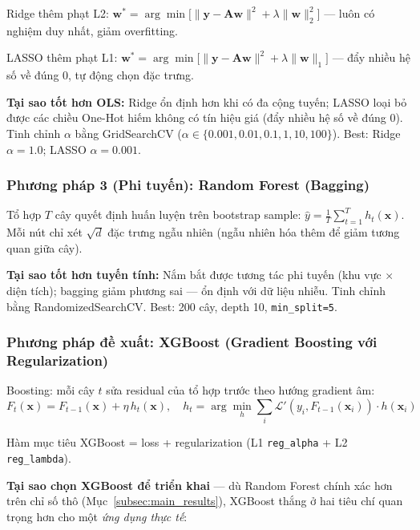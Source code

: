 Ridge thêm phạt L2:
$\mathbf{w}^* = \arg\min\bigl[\|\mathbf{y}-\mathbf{A}\mathbf{w}\|^2 + \lambda\|\mathbf{w}\|_2^2\bigr]$
— luôn có nghiệm duy nhất, giảm overfitting.

LASSO thêm phạt L1:
$\mathbf{w}^* = \arg\min\bigl[\|\mathbf{y}-\mathbf{A}\mathbf{w}\|^2 + \lambda\|\mathbf{w}\|_1\bigr]$
— đẩy nhiều hệ số về đúng 0, tự động chọn đặc trưng.

\textbf{Tại sao tốt hơn OLS:}
Ridge ổn định hơn khi có đa cộng tuyến; LASSO loại bỏ được các chiều One-Hot
hiếm không có tín hiệu giá (đẩy nhiều hệ số về đúng 0).
Tinh chỉnh $\alpha$ bằng GridSearchCV ($\alpha \in \{0.001, 0.01, 0.1, 1, 10, 100\}$).
Best: Ridge $\alpha = 1.0$; LASSO $\alpha = 0.001$.

\subsubsection*{Phương pháp 3 (Phi tuyến): Random Forest (Bagging)}

Tổ hợp $T$ cây quyết định huấn luyện trên bootstrap sample:
$\hat{y} = \frac{1}{T}\sum_{t=1}^{T}h_t(\mathbf{x})$.
Mỗi nút chỉ xét $\sqrt{d}$ đặc trưng ngẫu nhiên (ngẫu nhiên hóa thêm để giảm tương quan giữa cây).

\textbf{Tại sao tốt hơn tuyến tính:}
Nắm bắt được tương tác phi tuyến (khu vực × diện tích);
bagging giảm phương sai — ổn định với dữ liệu nhiễu.
Tinh chỉnh bằng RandomizedSearchCV.
Best: 200 cây, depth 10, \texttt{min\_split=5}.

\subsubsection*{Phương pháp đề xuất: XGBoost (Gradient Boosting với Regularization)}

Boosting: mỗi cây $t$ sửa residual của tổ hợp trước theo hướng gradient âm:
\[
  F_t(\mathbf{x}) = F_{t-1}(\mathbf{x}) + \eta\, h_t(\mathbf{x}),
  \quad h_t = \arg\min_h \sum_i \mathcal{L}'(y_i, F_{t-1}(\mathbf{x}_i))\cdot h(\mathbf{x}_i)
\]

Hàm mục tiêu XGBoost = loss + regularization (L1 \texttt{reg\_alpha} + L2 \texttt{reg\_lambda}).

\textbf{Tại sao chọn XGBoost để triển khai} — dù Random Forest chính xác hơn trên chỉ số thô
(Mục~\ref{subsec:main_results}), XGBoost thắng ở hai tiêu chí quan trọng hơn cho một
\textit{ứng dụng thực tế}:

